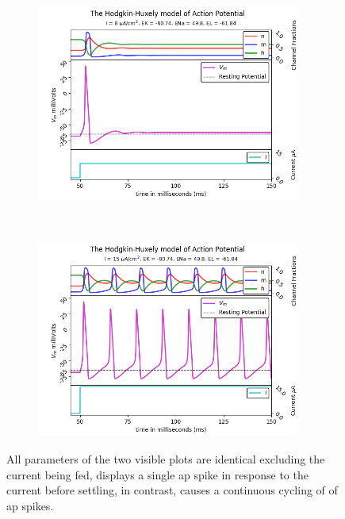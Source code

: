 \documentclass[class={myRUCProject}, crop=false]{standalone}
\begin{document}
\begin{figure}
    \centering
\begin{subfigure}{0.85\textwidth}
    \centering
    \includegraphics[width = 0.95\textwidth]{Pictures/HodHuxCurr8.png}
    \caption{}\label{fig:I08}
\end{subfigure}\\
\begin{subfigure}{0.85\textwidth}
    \centering
    \includegraphics[width = 0.95\textwidth]{Pictures/HodHuxCurr15.png}
    \caption{}\label{fig:I15}
\end{subfigure}
\caption{All parameters of the two visible plots are identical excluding the current being fed,  displays a single \gls{ap} spike in response to the current before settling, in contrast,  causes a continuous cycling of of \gls{ap} spikes.}
\end{figure}
\end{document}
